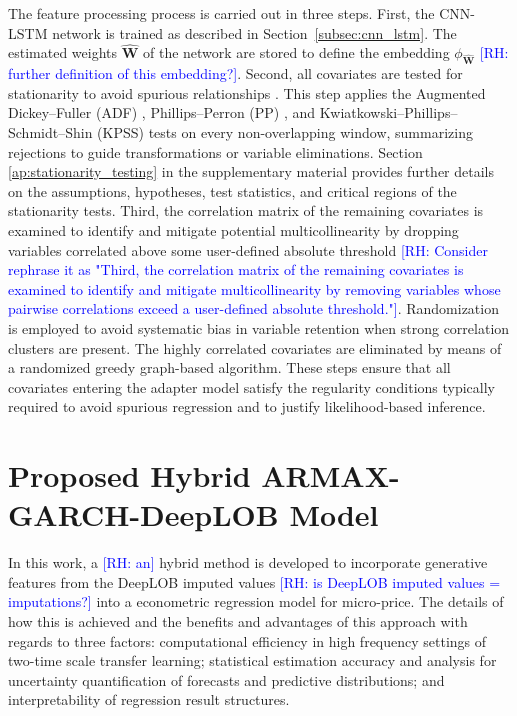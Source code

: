 \documentclass[10pt,a4paper,oneside]{article}
\newcommand{\rh}[1]{\textcolor{blue}{\textsf{[RH: #1]}}}
\begin{document}
The feature processing process is carried out in three steps. First, the CNN-LSTM network is trained as described in Section~\ref{subsec:cnn_lstm}. The estimated weights $\hat{\mathbf{W}}$ of the network are stored to define the embedding $\phi_{\hat{\mathbf{W}}}$ \rh{further definition of this embedding?}. Second, all covariates are tested for stationarity to avoid spurious relationships \cite{granger1974spurious, phillips1986understanding}. This step applies the Augmented Dickey--Fuller (ADF) \cite{said1984testing, hamilton_time_1994, banerjee1993co}, Phillips--Perron (PP) \cite{phillips1986understanding, hamilton_time_1994, banerjee1993co}, and Kwiatkowski--Phillips--Schmidt--Shin (KPSS) \cite{kwiatkowski1992testing} tests on every non-overlapping window, summarizing rejections to guide transformations or variable eliminations. Section \ref{ap:stationarity_testing} in the supplementary material provides further details on the assumptions, hypotheses, test statistics, and critical regions of the stationarity tests. Third, the correlation matrix of the remaining covariates is examined to identify and mitigate potential multicollinearity by dropping variables correlated above some user-defined absolute threshold \rh{Consider rephrase it as "Third, the correlation matrix of the remaining covariates is examined to identify and mitigate multicollinearity by removing variables whose pairwise correlations exceed a user-defined absolute threshold."}. Randomization is employed to avoid systematic bias in variable retention when strong correlation clusters are present. The highly correlated covariates are eliminated by means of a randomized greedy graph-based algorithm. These steps ensure that all covariates entering the adapter model satisfy the regularity conditions typically required to avoid spurious regression and to justify likelihood-based inference.

\section{Proposed Hybrid ARMAX-GARCH-DeepLOB Model}
\label{subsec:armax_garch_paper}
In this work, a \rh{an} hybrid method is developed to incorporate generative features from the DeepLOB imputed values \rh{is DeepLOB imputed values = imputations?} into a econometric regression model for micro-price. The details of how this is achieved and the benefits and advantages of this approach with regards to three factors: computational efficiency in high frequency settings of two-time scale transfer learning; statistical estimation accuracy and analysis for uncertainty quantification of forecasts and predictive distributions; and interpretability of regression result structures.
\end{document}
